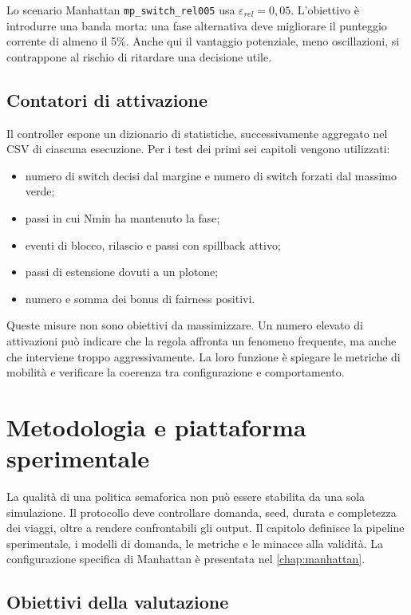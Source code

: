 \documentclass[12pt,a4paper,oneside]{report}
\numberwithin{equation}{chapter}
\begin{document}
Lo scenario Manhattan \texttt{mp\_switch\_rel005} usa
$\varepsilon_{rel}=0{,}05$. L'obiettivo è introdurre una banda morta: una fase
alternativa deve migliorare il punteggio corrente di almeno il 5\%. Anche qui
il vantaggio potenziale, meno oscillazioni, si contrappone al rischio di
ritardare una decisione utile.

\section{Contatori di attivazione}

Il controller espone un dizionario di statistiche, successivamente aggregato
nel CSV di ciascuna esecuzione.
Per i test dei primi sei capitoli vengono utilizzati:

\begin{itemize}
    \item numero di switch decisi dal margine e numero di switch forzati dal
    massimo verde;
    \item passi in cui Nmin ha mantenuto la fase;
    \item eventi di blocco, rilascio e passi con spillback attivo;
    \item passi di estensione dovuti a un plotone;
    \item numero e somma dei bonus di fairness positivi.
\end{itemize}

Queste misure non sono obiettivi da massimizzare. Un numero elevato di
attivazioni può indicare che la regola affronta un fenomeno frequente, ma anche
che interviene troppo aggressivamente. La loro funzione è spiegare le metriche
di mobilità e verificare la coerenza tra configurazione e comportamento.

\chapter{Metodologia e piattaforma sperimentale}
\label{chap:metodologia}

La qualità di una politica semaforica non può essere stabilita da una sola
simulazione. Il protocollo deve controllare domanda, seed, durata e completezza
dei viaggi, oltre a rendere confrontabili gli output. Il capitolo definisce la
pipeline sperimentale, i modelli di domanda, le metriche e le minacce alla
validità. La configurazione specifica di Manhattan è presentata nel
\cref{chap:manhattan}.

\section{Obiettivi della valutazione}
\end{document}
